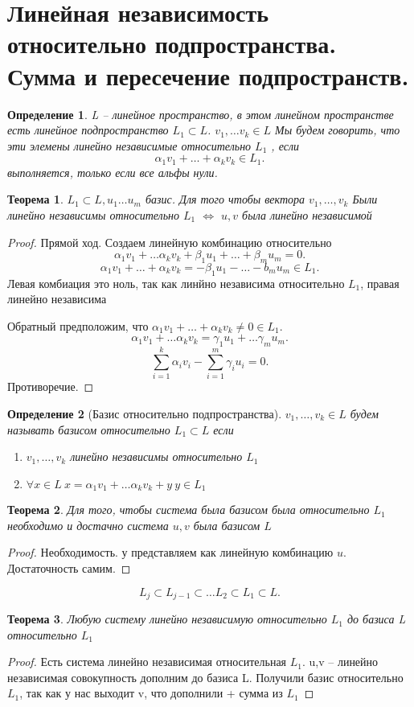 \documentclass{scrartcl}
\newtheorem{theorem}{Теорема}
\newtheorem{definition}{Определение}
\begin{document}
\section{Линейная независимость относительно подпространства. Сумма и пересечение подпространств.}
\begin{definition}
	L -- линейное пространство, в этом линейном пространстве есть линейное подпространство $L_1 \subset L$. $v_1,\dots v_{k} \in L$
	Мы будем говорить, что эти элемены линейно независимые относительно $L_1$ , если
	\[
		\alpha_1 v_1 + \dots + \alpha_{k} v_{k} \in L_1
		.\]
	выполняется, только если все альфы нули.
\end{definition}
\begin{theorem}
	$L_1 \subset L, u_1\dots u_{m}$ базис. Для того чтобы вектора $v_1,\dots,v_{k}$
	Были линейно независимы относительно $L_1$ $\iff$  $u,v$ была линейно независимой
\end{theorem}
\begin{proof}
	Прямой ход. Создаем линейную комбинацию относительно
	\[
		\alpha_1 v_1 + \dots \alpha_{k} v_{k} + \beta_1 u_1 + \dots + \beta_{m} u_{m} = 0
		.\]
	\[
		\alpha_1 v_1 + \dots + \alpha_{k}v_{k} = -\beta_1 u_1 - \dots - b_{m}u_{m} \in L_1
		.\]
	Левая комбиация это ноль, так как линйно независима относительно $L_1$, правая линейно независима

	Обратный предположим, что $\alpha_1 v_1 + \dots + \alpha_{k}v_{k} \neq 0 \in L_1$.
	\[
		\alpha_1v_1 + \dots \alpha_{k} v_{k} = \gamma_{1}u_{1} + \dots \gamma_{m}u_{m}
		.\]
	\[
		\sum_{i=1}^{k}\alpha_{i}v_{i} - \sum_{i = 1}^{m}\gamma_{i} u_{i} = 0
		.\]
	Противоречие.
\end{proof}
\begin{definition}[Базис относительно подпространства]
	$v_1,\dots,v_{k} \in L$ будем называть базисом относительно $L_1 \subset L$
	если
	\begin{enumerate}
		\item $v_1,\dots ,v_{k}$ линейно независимы относительно $L_1$
		\item $\forall  x \in L  ~ x = \alpha_1v_1 + \dots \alpha_{k}v_{k} + y ~ y\in L_1$
	\end{enumerate}
\end{definition}
\begin{theorem}
	Для того, чтобы система была базисом была относительно $L_1$ необходимо и достачно
	система $u,v$ была базисом  $L$
\end{theorem}
\begin{proof}
	Необходимость. у представляем как линейную комбинацию $u$.
	Достаточность самим.
\end{proof}
\[
	L_{j}\subset L_{j - 1}\subset \dots L_2 \subset L_1 \subset L
	.\]
\begin{theorem}
	Любую систему линейно независимую относительно $L_1$ до базиса L относительно $L_1$
\end{theorem}
\begin{proof}
	Есть система линейно независимая относительная $L_1$. u,v -- линейно независимая совокупность дополним до базиса L. Получили базис относительно $L_1$, так как у нас выходит v, что дополнили + сумма из  $L_1$
\end{proof}
\end{document}
